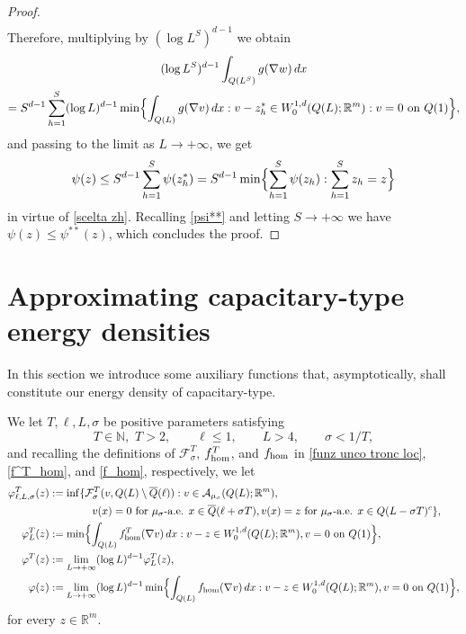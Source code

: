 \documentclass{article}
\theoremstyle{plain}
\theoremstyle{definition}
\def\rr{{\mathbb R}}
\def\NN{{\mathbb N}}
\def\ms{\mu_\sigma}
\newcommand{\f}{\varphi}
\newcommand{\s}{\sigma}
\newcommand{\A}{\mathcal{A}}
\newcommand{\F}{\mathcal{F}}
\numberwithin{equation}{section}
\begin{document}
\begin{proof}
\begin{align*}
\end{align*}
Therefore, multiplying by $(\log L^S)^{d-1}$ we obtain
\begin{multline*}
( \log L^S)^{d-1}\int_{Q(L^S)}g(\nabla w)\,dx \\ =    S^{d-1}\sum_{h=1}^S (\log L)^{d-1}    \min\Bigl\{\int_{Q(L)}g(\nabla v)\, dx : v-z_h^*\in W^{1,d}_0(Q(L); \rr^m): v=0 \text{ on } Q(1)\Bigr\},
\end{multline*}
and passing to the limit as $L\to+\infty$, we get
\begin{equation*}
    \psi(z)\leq S^{d-1}\sum_{h=1}^S\psi(z_h^*) =  S^{d-1}\min\Bigl\{\sum_{h=1}^S\psi(z_h):\sum_{h=1}^Sz_h=z\Bigr\}
\end{equation*}
in virtue of \eqref{scelta zh}. Recalling \eqref{psi**} and letting $S\to+\infty$ we have $\psi(z)\leq \psi^{**}(z)$, which concludes the proof. 
\end{proof}

\section{Approximating capacitary-type energy densities}
\label{Sec: Approximating capacitary-type energy densities}

In this section we introduce some auxiliary functions that, asymptotically, shall constitute our energy density of capacitary-type. 

We let $T, \ell, L,\s$ be positive parameters satisfying
\begin{equation*}
T\in\NN,\,\, T>2 ,\qquad \ell\leq 1, \qquad  L>4, \qquad  \s <1/T,  
\end{equation*} 
and recalling the definitions of $\F_\s^T$, $f^T_{\rm hom}$, and $f_{\rm hom}$ in \eqref{funz unco tronc loc}, \eqref{f^T_hom}, and \eqref{f_hom}, respectively, we let
\begin{align}
\label{def_minimi_approx}
    \f^T_{\ell,L,\sigma}(z) & :=
     \inf\{ \F^T_{\sigma}(v, Q(L)\setminus \overline{Q}(\ell)) : v\in \A_{\mu_\sigma}(Q(L); \rr^m), \\ \notag
     & \qquad \qquad v(x)= 0 \text{ for } \ms\text{-a.e. } x\in\overline{Q}(\ell+\sigma T),
     v(x)= z \text{ for } \ms\text{-a.e. } x\in Q(L-\sigma T)^c\}, \\ \notag
    \f^T_{L}(z) & := \min\Bigl\{ \int_{Q(L)}f^T_{\rm hom}(\nabla v)\, dx : v-z\in W^{1,d}_0(Q(L);\mathbb{R}^m), v= 0 \text{ on } Q(1)\Bigr\}, \\    
\label{limite_in_L}
    \f^T(z) & := \lim_{L\to+\infty} (\log L)^{d-1}\f^T_{L}(z), \\
\label{limit_denisty}
    \f(z) & := \lim_{L\to+\infty}(\log L)^{d-1}\min\Bigl\{ \int_{Q(L)}f_{\rm hom}(\nabla v)\, dx : v-z\in W^{1,d}_0(Q(L);\mathbb{R}^m), v= 0 \text{ on } Q(1)\Bigr\},
    \end{align}
for every $z\in\rr^m$. 
\end{document}
